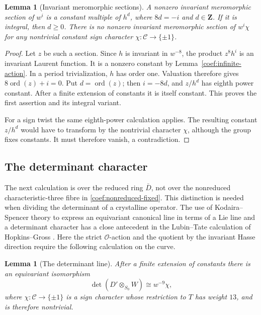 \documentclass[11pt]{article}
\newtheorem{lemma}[theorem]{Lemma}
\theoremstyle{definition}
\theoremstyle{remark}
\numberwithin{equation}{section}
\begin{document}
\begin{lemma}[Invariant meromorphic sections]\label{coef:hasse-powers}
A nonzero invariant meromorphic section of \(w^i\) is a constant
multiple of \(h^d\), where \(8d=-i\) and \(d\in\mathbf Z\).
If it is integral, then \(d\ge0\).
There is no nonzero invariant meromorphic section of \(w^i\chi\)
for any nontrivial constant sign character
\(\chi:\mathcal C\to\{\pm1\}\).
\end{lemma}

\begin{proof}
Let \(z\) be such a section.  Since \(h\) is invariant in \(w^{-8}\),
the product \(z^8h^i\) is an invariant Laurent function.
It is a nonzero constant by Lemma~\ref{coef:infinite-action}.
In a period trivialization, \(h\) has order one.
Valuation therefore gives \(8\operatorname{ord}(z)+i=0\).
Put \(d=\operatorname{ord}(z)\); then \(i=-8d\), and \(z/h^d\) has eighth
power constant.  After a finite extension of constants it is itself
constant.  This proves the first assertion and its integral variant.

For a sign twist the same eighth-power calculation applies.
The resulting constant \(z/h^d\) would have to transform by the
nontrivial character \(\chi\), although the group fixes constants.
It must therefore vanish, a contradiction.
\end{proof}

\subsection{The determinant character}

The next calculation is over the reduced ring \(\bar D\), not over
the nonreduced characteristic-three fibre in
\eqref{coef:nonreduced-fixed}.  This distinction is needed when
dividing the determinant of a crystalline operator.
The use of Kodaira--Spencer theory to express an equivariant
canonical line in terms of a Lie line and a determinant character
has a close antecedent in the Lubin--Tate calculation of
Hopkins--Gross \cite[Section~1.2 and Corollary~3]{HopkinsGross}.
Here the strict \(\mathcal O\)-action and the quotient by the invariant
Hasse direction require the following calculation on the curve.

\begin{lemma}[The determinant line]\label{coef:determinant}
After a finite extension of constants there is an equivariant
isomorphism
\begin{equation}\label{coef:determinant-formula}
 \det(D'\otimes_{S_0}W)\cong w^{-9}\chi,
\end{equation}
where \(\chi:\mathcal C\to\{\pm1\}\) is a sign character whose
restriction to \(T\) has weight \(13\), and is therefore nontrivial.
\end{lemma}
\end{document}
